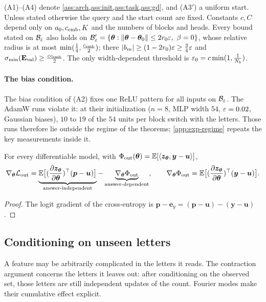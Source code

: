 (A1)--(A4) denote \cref{ass:arch,ass:init,ass:task,ass:gd}, and (A3$'$) a uniform start. Unless stated otherwise the query and the start
count are fixed. Constants $c,C$ depend only on $a_0,c_{\mathrm{emb}},K$ and the numbers of blocks and heads. Every bound stated on $\mathcal B_{\varepsilon}$ also
holds on $\initball'=\{\bm\theta:\|\bm\theta-\bm\theta_0\|\le2\ballradius\initscale,\ \beta=0\}$, whose relative radius is at most $\min(\frac{1}{4},\frac{c_{\mathrm{emb}}}{2})$; there
$|b_m|\ge(1-2r_0)\varepsilon\ge\frac{3}{4}\varepsilon$ and $\sigma_{\min}(\mathbf E_{\mathrm{val}})\ge\frac{\varepsilon c_{\mathrm{emb}}}{2}$. The only width-dependent threshold is $\varepsilon_0=c\min(1,\frac{1}{N_b})$.

\paragraph{The bias condition.}\label{rem:two-block-bias} The bias condition of (A2) fixes one ReLU pattern for all inputs on $\mathcal B_{\varepsilon}$. The AdamW runs violate it: at their initialization
($n=8$, MLP width $54$, $\varepsilon=0.02$, Gaussian biases), $10$ to $19$ of the $54$ units per block switch with the letters. Those
runs therefore lie outside the regime of the theorems; \cref{app:exp-regime} repeats the key measurements inside it.


\begin{lemma}
\label{lem:gradient-split}
For every differentiable model, with $\Phi_{\mathrm{out}}(\bm\theta)=\mathbb E[\langle\bm z_{\bm\theta},\bm y-\bm u\rangle]$,
\[
 \nabla_{\bm\theta}\Lout=\underbrace{\E\bigl[(\Jz)^\top(\bm p-\bm u)\bigr]}_{\text{answer-independent}}-\underbrace{\nabla_{\bm\theta}\outcredit}_{\text{answer-dependent}},\qquad
 \nabla_{\bm\theta}\outcredit=\E\bigl[(\Jz)^\top(\bm y-\bm u)\bigr].
\]
\end{lemma}

\begin{proof}
The logit gradient of the cross-entropy is $\bm p-\bm e_y=(\bm p-\bm u)-(\bm y-\bm u)$.
\end{proof}

\subsection{Conditioning on unseen letters}
\label{app:target-spectrum}

A feature may be arbitrarily complicated in the letters it reads. The contraction argument concerns the letters it leaves out:
after conditioning on the observed set, those letters are still independent updates of the count. Fourier modes make their
cumulative effect explicit.

